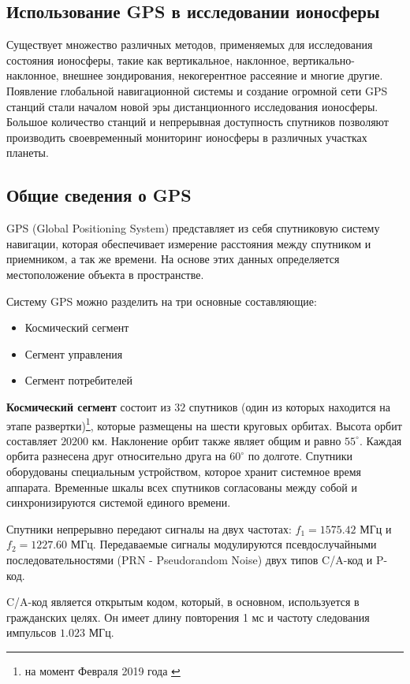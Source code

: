 \documentclass[14pt]{article}
\begin{document}
\subsection{Использование GPS в исследовании ионосферы}
Существует множество различных методов, применяемых для исследования состояния ионосферы, такие как вертикальное, наклонное, вертикально-наклонное, внешнее зондирования, некогерентное рассеяние и многие другие. Появление глобальной навигационной системы и создание огромной сети GPS станций стали началом новой эры дистанционного исследования ионосферы. Большое количество станций и непрерывная доступность спутников позволяют производить своевременный мониторинг ионосферы в различных участках планеты. 

\subsection{Общие сведения о GPS}
GPS (Global Positioning System) представляет из себя спутниковую систему навигации, которая обеспечивает измерение расстояния между спутником и приемником, а так же времени. На основе этих данных определяется местоположение объекта в пространстве.

Систему GPS можно разделить на три основные составляющие:
\begin{itemize}
\item Космический сегмент
\item Сегмент управления
\item Сегмент потребителей
\end{itemize}

\textbf{Космический сегмент} состоит из $32$ спутников (один из которых находится на этапе развертки)\footnote{на момент Февраля 2019 года \cite{gpsgov}}, которые размещены на шести круговых орбитах. Высота орбит составляет $20200$ км. Наклонение орбит также являет общим и равно $55^{\circ}$. Каждая орбита разнесена друг относительно друга на $60^{\circ}$ по долготе. Спутники оборудованы специальным устройством, которое хранит системное время аппарата. Временные шкалы всех спутников согласованы между собой и синхронизируются системой единого времени.

Спутники непрерывно передают сигналы на двух частотах: $f_1 = 1575.42 \text{ МГц}$ и $f_2 = 1227.60 \text{ МГц}$. Передаваемые сигналы модулируются псевдослучайными последовательностями (PRN - Pseudorandom Noise) двух типов C/A-код и P-код.

C/A-код является открытым кодом, который, в основном, используется в гражданских целях. Он имеет длину повторения 1 мс и частоту следования импульсов $1.023 \text{ МГц}$.
\end{document}
